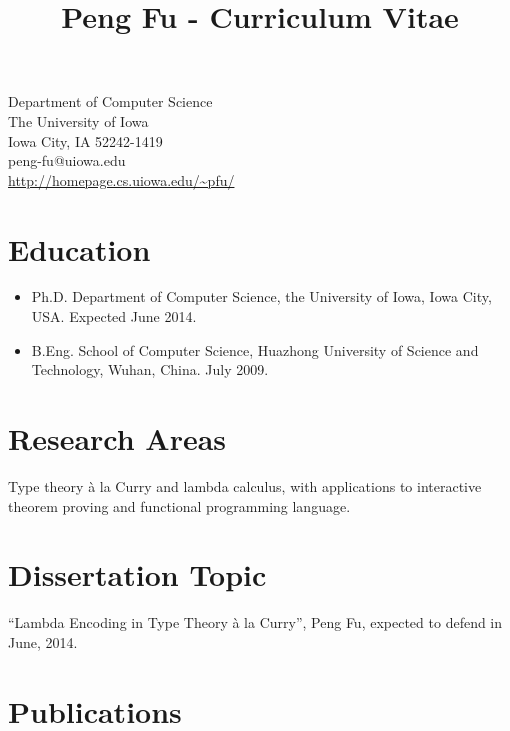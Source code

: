 \documentclass[10pt]{article}
\title{\bfseries\Large Peng Fu - Curriculum Vitae}
\date{}
\begin{document}
\maketitle
\vspace{-4em}
\begin{center}
\begin{minipage}[c]{0.48\textwidth}
Department of Computer Science\\
The University of Iowa\\
Iowa City, IA 52242-1419\\
peng-fu@uiowa.edu\\
\url{http://homepage.cs.uiowa.edu/~pfu/}
\end{minipage}
\end{center}
\vspace{20pt}

\section*{Education}


\begin{itemize}
\item   Ph.D. Department of Computer Science, the University of Iowa, Iowa City, USA. Expected June 2014.
  \item B.Eng. School of Computer Science, Huazhong University of Science and Technology, Wuhan, China. July 2009.
\end{itemize}


\section*{Research Areas}
Type theory \`a la Curry and lambda calculus, with applications to interactive theorem proving and functional programming language. 

\section*{Dissertation Topic}
``Lambda Encoding in Type Theory \`a la Curry'', Peng Fu, expected to defend in June, 2014.

\section*{Publications}
\end{document}
